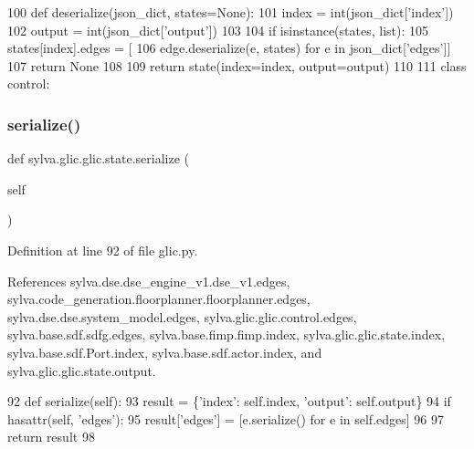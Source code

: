\begin{DoxyCode}
100     \textcolor{keyword}{def }deserialize(json\_dict, states=None):
101       index = int(json\_dict[\textcolor{stringliteral}{'index'}])
102       output = int(json\_dict[\textcolor{stringliteral}{'output'}])
103 
104       \textcolor{keywordflow}{if} isinstance(states, list):
105         states[index].edges = [
106             edge.deserialize(e, states) \textcolor{keywordflow}{for} e \textcolor{keywordflow}{in} json\_dict[\textcolor{stringliteral}{'edges'}]]
107         \textcolor{keywordflow}{return} \textcolor{keywordtype}{None}
108 
109       \textcolor{keywordflow}{return} state(index=index, output=output)
110 
111   \textcolor{keyword}{class }control:
\end{DoxyCode}
\mbox{\label{classsylva_1_1glic_1_1glic_1_1state_a09708ff3d56142db919a172a0cb849e1}} 
\subsubsection{\texorpdfstring{serialize()}{serialize()}}
{\footnotesize\ttfamily def sylva.\+glic.\+glic.\+state.\+serialize (\begin{DoxyParamCaption}\item[{}]{self }\end{DoxyParamCaption})}



Definition at line 92 of file glic.\+py.



References sylva.\+dse.\+dse\+\_\+engine\+\_\+v1.\+dse\+\_\+v1.\+edges, sylva.\+code\+\_\+generation.\+floorplanner.\+floorplanner.\+edges, sylva.\+dse.\+dse.\+system\+\_\+model.\+edges, sylva.\+glic.\+glic.\+control.\+edges, sylva.\+base.\+sdf.\+sdfg.\+edges, sylva.\+base.\+fimp.\+fimp.\+index, sylva.\+glic.\+glic.\+state.\+index, sylva.\+base.\+sdf.\+Port.\+index, sylva.\+base.\+sdf.\+actor.\+index, and sylva.\+glic.\+glic.\+state.\+output.


\begin{DoxyCode}
92     \textcolor{keyword}{def }serialize(self):
93       result = \{\textcolor{stringliteral}{'index'}: self.index, \textcolor{stringliteral}{'output'}: self.output\}
94       \textcolor{keywordflow}{if} hasattr(self, \textcolor{stringliteral}{'edges'}):
95         result[\textcolor{stringliteral}{'edges'}] = [e.serialize() \textcolor{keywordflow}{for} e \textcolor{keywordflow}{in} self.edges]
96 
97       \textcolor{keywordflow}{return} result
98 
\end{DoxyCode}



